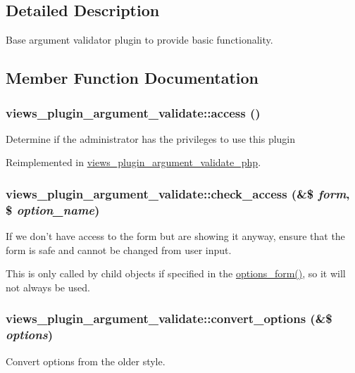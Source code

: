 \subsection{Detailed Description}
Base argument validator plugin to provide basic functionality. 

\subsection{Member Function Documentation}
\hypertarget{classviews__plugin__argument__validate_ab90c095a5a91dcf8dfae02dc975d974e}{
\subsubsection[{access}]{\setlength{\rightskip}{0pt plus 5cm}views\_\-plugin\_\-argument\_\-validate::access ()}}
\label{classviews__plugin__argument__validate_ab90c095a5a91dcf8dfae02dc975d974e}
Determine if the administrator has the privileges to use this plugin 

Reimplemented in \hyperlink{classviews__plugin__argument__validate__php_a11100ee9f3e1d9ec27f3f1b151994d1c}{views\_\-plugin\_\-argument\_\-validate\_\-php}.\hypertarget{classviews__plugin__argument__validate_ae0b2596e21cf8f576a4882bbfd634ccf}{
\subsubsection[{check\_\-access}]{\setlength{\rightskip}{0pt plus 5cm}views\_\-plugin\_\-argument\_\-validate::check\_\-access (\&\$ {\em form}, \/  \$ {\em option\_\-name})}}
\label{classviews__plugin__argument__validate_ae0b2596e21cf8f576a4882bbfd634ccf}
If we don't have access to the form but are showing it anyway, ensure that the form is safe and cannot be changed from user input.

This is only called by child objects if specified in the \hyperlink{classviews__plugin__argument__validate_a619aac79800de4535d25fd93ce1f08cc}{options\_\-form()}, so it will not always be used. \hypertarget{classviews__plugin__argument__validate_a2de4a9571ea48105e195c483b13f5577}{
\subsubsection[{convert\_\-options}]{\setlength{\rightskip}{0pt plus 5cm}views\_\-plugin\_\-argument\_\-validate::convert\_\-options (\&\$ {\em options})}}
\label{classviews__plugin__argument__validate_a2de4a9571ea48105e195c483b13f5577}
Convert options from the older style.

